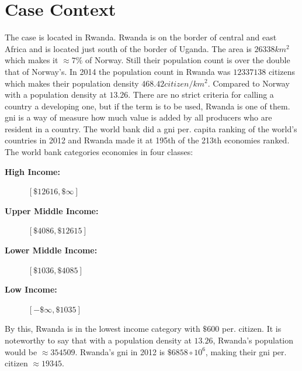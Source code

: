 \chapter{Case Context}
The case is located in Rwanda. Rwanda is on the border of central and east Africa and is located just south of the border of Uganda. 
The area is $26338km^2$ which makes it $\approx 7\%$ of Norway. 
Still their population count is over the double that of Norway's. 
In 2014 the population count in Rwanda was $12337138$ citizens which makes their population density $468.42citizen/km^2$. 
Compared to Norway with a population density at $13.26$. 
There are no strict criteria for calling a country a developing one, but if the term is to be used, Rwanda is one of them. 
\gls{gni} is a way of measure how much value is added by all producers who are resident in a country. 
The world bank did a \gls{gni} per. capita ranking of the world's countries in 2012 and Rwanda made it at 195th of the 213th economies ranked. The world bank categories economies in four classes:
\begin{description}
\item[\textbf{High Income:}]{$[\$12616, \$\infty]$}
\item[\textbf{Upper Middle Income:}]{$[\$4086, \$12615]$}
\item[\textbf{Lower Middle Income:}]{$[\$1036, \$4085]$}
\item[\textbf{Low Income:}]{$[-\$\infty, \$1035]$}
\end{description}

By this, Rwanda is in the lowest income category with $\$600$ per. citizen.
It is noteworthy to say that with a population density at $13.26$, Rwanda's population would be $\approx 354509$.
Rwanda's \gls{gni} in 2012 is $\$6858 \circ 10^{6}$, making their \gls{gni} per. citizen $\approx 19345$. 

\cite{rw:snl}
\cite{ssb:folketall}
\cite{gni:wb}
\cite{gni:wbper}

